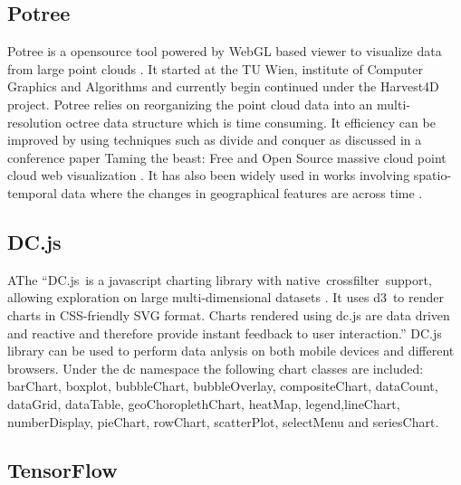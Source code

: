 \subsection{Potree }

    Potree is a opensource tool powered by WebGL
    based viewer to visualize data from large point clouds \cite{www-potree}.
    It started at the TU Wien, institute of
    Computer Graphics and Algorithms and
    currently begin continued under the Harvest4D project. Potree
    relies on reorganizing the point cloud data into an
    multi-resolution octree data structure which is time consuming. It
    efficiency can be improved by using techniques such as divide and
    conquer as discussed in a conference paper Taming the beast: Free
    and Open Source massive cloud point cloud web
    visualization \cite{potree-paper-1}. It has also been widely used
    in works involving spatio-temporal data where the changes in
    geographical features are across time \cite{potree-paper-2}.

    \pv
    
\subsection{DC.js}

    AThe ``DC.js is a javascript charting
    library with native crossfilter support, allowing exploration on
    large multi-dimensional datasets \cite{www-dcjs}. It uses d3 to
    render charts in
    CSS-friendly SVG format. Charts rendered using dc.js are data
    driven and reactive and therefore provide instant feedback to user
    interaction.'' DC.js library can be used to perform data anlysis
    on both mobile devices and different browsers. Under the dc
    namespace the following chart classes are included: barChart,
    boxplot, bubbleChart, bubbleOverlay, compositeChart, dataCount,
    dataGrid, dataTable, geoChoroplethChart, heatMap,
    legend,lineChart, numberDisplay, pieChart, rowChart, scatterPlot,
    selectMenu and seriesChart.

    \pv
      
\subsection{TensorFlow}

